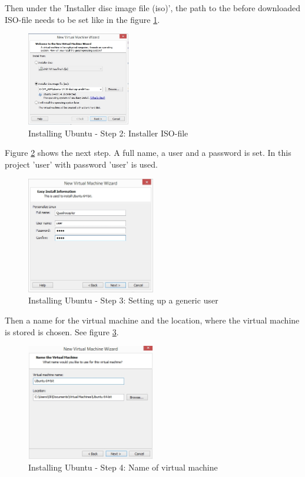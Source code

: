 Then under the 'Installer disc image file (iso)', the path to the before downloaded ISO-file needs to be set like in the figure \ref{fig:Ub2}.

\begin{figure}[H]
	\centering\includegraphics[width=0.4\textwidth]{fig/Dev_Concept/Ub2.jpg}
	\caption{Installing Ubuntu - Step 2: Installer ISO-file}
	\label{fig:Ub2}
\end{figure}

Figure \ref{fig:Ub3} shows the next step. A full name, a user and a password is set. In this project 'user' with password 'user' is used.

\begin{figure}[H]
	\centering\includegraphics[width=0.5\textwidth]{fig/Dev_Concept/Ub3.jpg}
	\caption{Installing Ubuntu - Step 3: Setting up a generic user}
	\label{fig:Ub3}
\end{figure}

Then a name for the virtual machine and the location, where the virtual machine is stored is chosen. See figure \ref{fig:Ub4}.

\begin{figure}[H]
	\centering\includegraphics[width=0.5\textwidth]{fig/Dev_Concept/Ub4.jpg}
	\caption{Installing Ubuntu - Step 4: Name of virtual machine}
	\label{fig:Ub4}
\end{figure}

